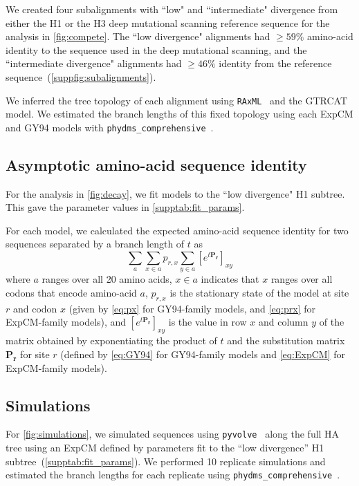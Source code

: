 \documentclass[11pt]{article}
\begin{document}
We created four subalignments with ``low" and ``intermediate" divergence from either the H1 or the H3 deep mutational scanning reference sequence for the analysis in \ref{fig:compete}. 
The ``low divergence" alignments had $\ge 59\%$ amino-acid identity to the sequence used in the deep mutational scanning, and the ``intermediate divergence" alignments had $\ge 46\%$ identity from the reference sequence~(\ref{suppfig:subalignments}).

We inferred the tree topology of each alignment using \texttt{RAxML}~\citep{stamatakis2006raxml} and the GTRCAT model. 
We estimated the branch lengths of this fixed topology using each ExpCM and GY94 models with \texttt{phydms\_comprehensive}~\citep{hilton2017phydms}. 

\subsection*{Asymptotic amino-acid sequence identity}
For the analysis in \ref{fig:decay}, we fit models to the ``low divergence" H1 subtree.
This gave the parameter values in \ref{supptab:fit_params}. 

For each model, we calculated the expected amino-acid sequence identity for two sequences separated by a branch length of $t$ as 
\begin{equation}
\label{eq:f}
\sum_a \sum_{x \in a} p_{r,x} \sum_{y \in a} \left[e^{t\mathbf{P_r}}\right]_{xy}
\end{equation}
where $a$ ranges over all 20 amino acids, $x \in a$ indicates that $x$ ranges over all codons that encode amino-acid $a$, $p_{r,x}$ is the stationary state of the model at site $r$ and codon $x$ (given by \ref{eq:px} for GY94-family models, and \ref{eq:prx} for ExpCM-family models), and $\left[e^{t\mathbf{P_r}}\right]_{xy}$ is the value in row $x$ and column $y$ of the matrix obtained by exponentiating the product of $t$ and the substitution matrix $\mathbf{P_r}$ for site $r$ (defined by \ref{eq:GY94} for GY94-family models and \ref{eq:ExpCM} for ExpCM-family models).

\subsection*{Simulations}
For \ref{fig:simulations}, we simulated sequences using \texttt{pyvolve}~\citep{spielman2015pyvolve} along the full HA tree using an ExpCM defined by parameters fit to the ``low divergence'' H1 subtree~(\ref{supptab:fit_params}). We performed 10 replicate simulations and estimated the branch lengths for each replicate using \texttt{phydms\_comprehensive}~\citep{hilton2017phydms}. 
\end{document}

